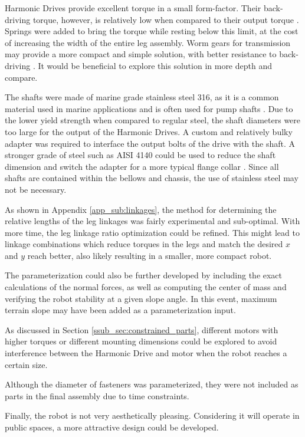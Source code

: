 
Harmonic Drives provide excellent torque in a small form-factor.
Their back-driving torque, however, is relatively low when compared to their output torque \cite{harmonic_drive_csd-2a_2019}.
Springs were added to bring the torque while resting below this limit, at the cost of increasing the width of the entire leg assembly.
Worm gears for transmission may provide a more compact and simple solution, with better resistance to back-driving \cite{spiroidgearing_worm_2019}. It would be beneficial to explore this solution in more depth and compare.

The shafts were made of marine grade stainless steel 316, as it is a common material used in marine applications and is often used for pump shafts \cite{metal_supermarkets_marine_2017}.
Due to the lower yield strength when compared to regular steel, the shaft diameters were too large for the output of the Harmonic Drives. A custom and relatively bulky adapter was required to interface the output bolts of the drive with the shaft.
A stronger grade of steel such as AISI 4140 could be used to reduce the shaft dimension and switch the adapter for a more typical flange collar \cite{mcmaster-carr_rotary_2019}. Since all shafts are contained within the bellows and chassis, the use of stainless steel may not be necessary.

As shown in Appendix \ref{app_sub:linkages}, the method for determining the relative lengths of the leg linkages was fairly experimental and sub-optimal. With more time, the leg linkage ratio optimization could be refined. This might lead to linkage combinations which reduce torques in the legs and match the desired $x$ and $y$ reach better, also likely resulting in a smaller, more compact robot.

The parameterization could also be further developed by including the exact calculations of the normal forces, as well as computing the center of mass and verifying the robot stability at a given slope angle. In this event, maximum terrain slope may have been added as a parameterization input.

As discussed in Section \ref{ssub_sec:constrained_parts}, different motors with higher torques or different mounting dimensions could be explored to avoid interference between the Harmonic Drive and motor when the robot reaches a certain size.

Although the diameter of fasteners was parameterized, they were not included as parts in the final assembly due to time constraints.

Finally, the robot is not very aesthetically pleasing. Considering it will operate in public spaces, a more attractive design could be developed.